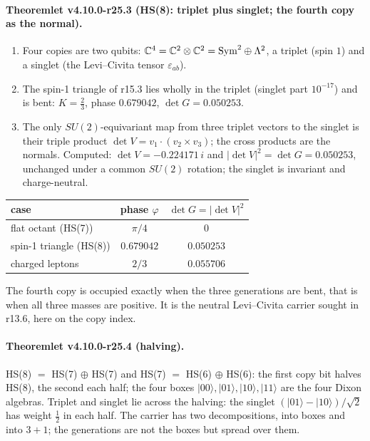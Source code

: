 \paragraph{Theoremlet v4.10.0-r25.3 (HS(8): triplet plus singlet; the fourth copy as the normal).}
\begin{enumerate}[leftmargin=2em]
\item[(a)] Four copies are two qubits: \(\mathbb C^4=\mathbb C^2\otimes\mathbb C^2=\mathrm{Sym}^2\oplus\Lambda^2\), a triplet (spin \(1\)) and a singlet (the Levi--Civita
tensor \(\varepsilon_{ab}\)).
\item[(b)] The spin-1 triangle of r15.3 lies wholly in the triplet (singlet part \(10^{-17}\)) and is bent: \(K=\tfrac23\), phase \(0.679042\),
\(\det G=0.050253\).
\item[(c)] The only \(SU(2)\)-equivariant map from three triplet vectors to the singlet is their triple product \(\det V=v_1\cdot(v_2\times v_3)\);
the cross products are the normals.  Computed: \(\det V=-0.224171\,i\) and \(|\det V|^2=\det G=0.050253\), unchanged under a common \(SU(2)\)
rotation; the singlet is invariant and charge-neutral.
\end{enumerate}
\begin{center}
\small
\begin{tabular}{@{}lcc@{}}
\toprule
case & phase \(\varphi\) & \(\det G=|\det V|^2\)\\
\midrule
flat octant (HS(7)) & \(\pi/4\) & \(0\)\\
spin-1 triangle (HS(8)) & \(0.679042\) & \(0.050253\)\\
charged leptons & \(2/3\) & \(0.055706\)\\
\bottomrule
\end{tabular}
\end{center}
The fourth copy is occupied exactly when the three generations are bent, that is when all three masses are positive.  It is the neutral
Levi--Civita carrier sought in r13.6, here on the copy index.

\paragraph{Theoremlet v4.10.0-r25.4 (halving).}
HS(8) \(=\) HS(7) \(\oplus\) HS(7) and HS(7) \(=\) HS(6) \(\oplus\) HS(6): the first copy bit halves HS(8), the second each half; the four boxes
\(|00\rangle,|01\rangle,|10\rangle,|11\rangle\) are the four Dixon algebras.  Triplet and singlet lie across the halving: the singlet
\((|01\rangle-|10\rangle)/\sqrt2\) has weight \(\tfrac12\) in each half.  The carrier has two decompositions, into boxes and into \(3+1\); the
generations are not the boxes but spread over them.


